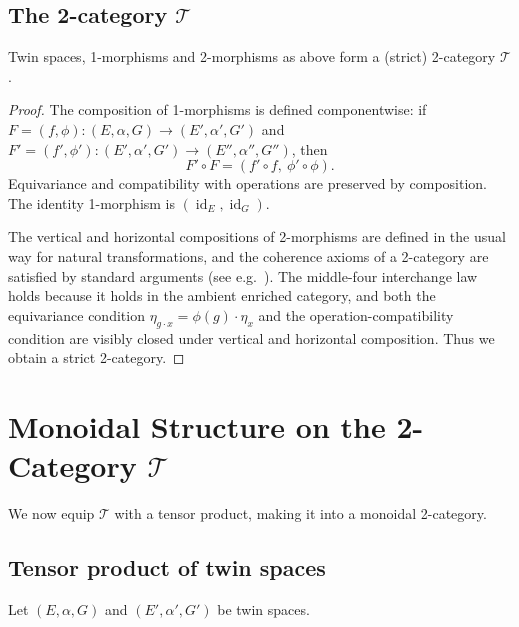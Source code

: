 \documentclass[11pt,a4paper]{article}
\numberwithin{equation}{section}
\DeclareMathOperator{\id}{id}
\newcommand{\TwinSpace}{(E,\alpha,G)}
\newcommand{\Twin}{\mathcal{T}}
\begin{document}
	\subsection{The 2-category \texorpdfstring{$\Twin$}{Twin}}
	
	\begin{theorem}\label{thm:Twin-2cat}
		Twin spaces, 1-morphisms and 2-morphisms as above form a (strict) 2-category $\Twin$.
	\end{theorem}
	
	\begin{proof}
		The composition of 1-morphisms is defined componentwise:
		if $F=(f,\phi):\TwinSpace\to (E',\alpha',G')$ and $F'=(f',\phi'):(E',\alpha',G')\to (E'',\alpha'',G'')$,
		then
		\[
		F'\circ F = (f'\circ f,\ \phi'\circ \phi).
		\]
		Equivariance and compatibility with operations are preserved by composition.
		The identity 1-morphism is $(\id_E,\id_G)$.
		
		The vertical and horizontal compositions of 2-morphisms are defined in the usual way for natural
		transformations, and the coherence axioms of a 2-category are satisfied by standard arguments
		(see e.g.~\cite{MacLane1998,Leinster2004}). The middle-four interchange law holds because it holds in the
		ambient enriched category, and both the equivariance condition $\eta_{g\cdot x}=\phi(g)\cdot\eta_x$ and the
		operation-compatibility condition are visibly closed under vertical and horizontal composition. Thus we obtain a strict 2-category.
	\end{proof}
	
	\section{Monoidal Structure on the 2-Category \texorpdfstring{$\Twin$}{Twin}}
	\label{sec:monoidal}
	
	We now equip $\Twin$ with a tensor product, making it into a monoidal 2-category.
	
	\subsection{Tensor product of twin spaces}
	
	Let $\TwinSpace$ and $(E',\alpha',G')$ be twin spaces.
	
\end{document}
